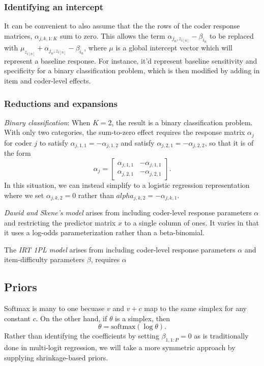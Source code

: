 \documentclass[10pt]{article}
\newcommand{\range}[2]{#1{:}#2}
\newcommand{\rng}[1]{\range{1}{#1}}
\begin{document}
\subsubsection*{Identifying an intercept}

It can be convenient to also assume that the the rows of the coder
response matrices, $\alpha_{j, k, \rng{K}}$ sum to zero.  This allows
the term
$\alpha_{j_n, z_{i[n]}} - \beta_{i_n}$ to be replaced with
$\mu_{z_{i[n]}} + \alpha_{j_n, z_{i[n]}} - \beta_{i_n}$, where $\mu$ is a global
intercept vector which will represent a baseline response.
For instance, it'd represent baseline sensitivity
and specificity for a binary classification problem, which is then
modified by adding in item and coder-level effects.


\subsubsection*{Reductions and expansions}


\textit{Binary classification}: When $K = 2$, the result is a binary
classification problem.  With only two categories, the sum-to-zero
effect requires the response matrix $\alpha_j$ for coder $j$ to
satisfy $\alpha_{j, 1, 1} = -\alpha_{j, 1, 2}$ and
satisfy $\alpha_{j, 2, 1} = -\alpha_{j, 2, 2}$, so that it is of the form
\[
  \alpha_j =
  \begin{bmatrix}
    \alpha_{j, 1, 1} & -\alpha_{j, 1, 1}
    \\
    \alpha_{j, 2, 1} & -\alpha_{j, 2, 1}
  \end{bmatrix}.
\]
In this situation, we can instead simplify to a logistic regression
representation where we set $\alpha_{j, k, 2} = 0$ rather than
$alpha_{j, k, 2} = -\alpha_{j, k, 1}$.

\textit{Dawid and Skene's model} arises from including coder-level
response parameters $\alpha$ and restricting the predictor matrix $x$
to a single column of ones. It varies in that it uses a log-odds
parameterization rather than a beta-binomial.

The \textit{IRT 1PL model} arises from including coder-level response
parameters $\alpha$ and item-difficulty parameters $\beta$, requires
$\alpha$




\subsection{Priors}

Softmax is many to one becuase $v$ and $v + c$ map to the
same simplex for any constant $c$.  On the other hand, if $\theta$ is
a simplex, then 
\[
  \theta = \textrm{softmax}(\log \theta).
\]
Rather than identifying the coefficients by setting
$\beta_{1, \rng{P}} = 0$ as is traditionally done in multi-logit
regression, we will take a more symmetric approach by supplying
shrinkage-based priors.
\end{document}
